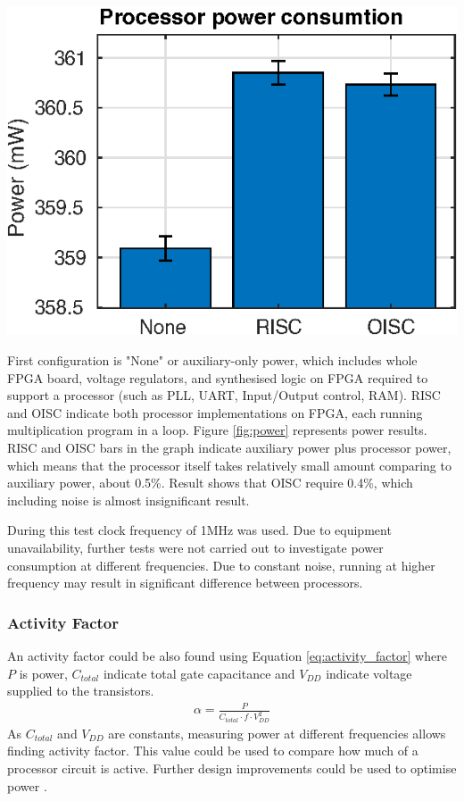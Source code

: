\begin{colfigure}
	\centering
	\includegraphics[width=\linewidth]{../tests/power.eps}
	\label{fig:power}
\end{colfigure}

First configuration is "None" or auxiliary-only power, which includes whole FPGA board, voltage regulators, and synthesised logic on FPGA required to support a processor (such as PLL, UART, Input/Output control, RAM). RISC and OISC indicate both processor implementations on FPGA, each running multiplication program in a loop. Figure \ref{fig:power} represents power results. RISC and OISC bars in the graph indicate auxiliary power plus processor power, which means that the processor itself takes relatively small amount comparing to auxiliary power, about 0.5\%. Result shows that OISC require 0.4\%, which including noise is almost insignificant result.

During this test clock frequency of 1MHz was used. Due to equipment unavailability, further tests were not carried out to investigate power consumption at different frequencies. Due to constant noise, running at higher frequency may result in significant difference between processors.

\subsubsection{Activity Factor}\label{subsec:activity_factor}
An activity factor could be also found using Equation \ref{eq:activity_factor} where $P$ is power, $C_{total}$ indicate total gate capacitance and $V_{DD}$ indicate voltage supplied to the transistors.
\begin{align}\label{eq:activity_factor}
\alpha = \frac{P}{C_{total}\cdot f \cdot V_{DD}^2}
\end{align}
As $C_{total}$ and $V_{DD}$ are constants, measuring power at different frequencies allows finding activity factor. This value could be used to compare how much of a processor circuit is active. Further design improvements could be used to optimise power \autocite{8682289,7363689,1207041,6972455}.


